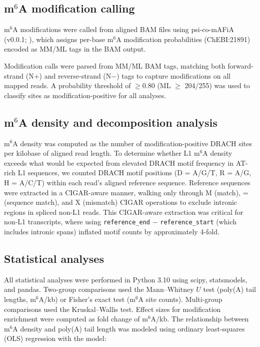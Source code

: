 \documentclass[11pt]{article}
\newcommand{\msix}{m$^6$A}
\begin{document}
\subsection*{\msix{} modification calling}

\msix{} modifications were called from aligned BAM files using
psi-co-mAFiA (v0.0.1; \citealp{Hendra2022}), which
assigns per-base \msix{} modification probabilities (ChEBI:21891)
encoded as MM/ML tags in the BAM output.

Modification calls were parsed from MM/ML BAM tags, matching both
forward-strand (N$+$) and reverse-strand
(N$-$) tags to capture modifications on all mapped reads.
A probability threshold of $\geq 0.80$ (ML $\geq$ 204/255) was used to
classify sites as modification-positive for all analyses.

\subsection*{\msix{} density and decomposition analysis}

\msix{} density was computed as the number of modification-positive DRACH
sites per kilobase of aligned read length. To determine whether L1
\msix{} density exceeds what would be expected from elevated DRACH motif
frequency in AT-rich L1 sequences, we counted DRACH motif positions
(D = A/G/T, R = A/G, H = A/C/T) within each read's aligned reference
sequence. Reference sequences were extracted in a CIGAR-aware manner,
walking only through M (match), = (sequence match), and X (mismatch)
CIGAR operations to exclude intronic regions in spliced non-L1 reads.
This CIGAR-aware extraction was critical for non-L1 transcripts, where
using \texttt{reference\_end} $-$ \texttt{reference\_start} (which
includes intronic spans) inflated motif counts by approximately 4-fold.

\subsection*{Statistical analyses}

All statistical analyses were performed in Python 3.10 using scipy,
statsmodels, and pandas. Two-group comparisons used the Mann--Whitney
$U$ test (poly(A) tail lengths, \msix{}/kb) or Fisher's exact test
(\msix{} site counts). Multi-group comparisons used the
Kruskal--Wallis test. Effect sizes for modification enrichment were
computed as fold change of \msix{}/kb. The relationship between \msix{} density and
poly(A) tail length was modeled using ordinary least-squares (OLS)
regression with the model:
\end{document}
